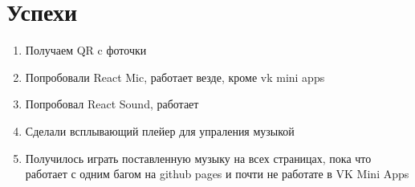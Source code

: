 \documentclass[11pt]{article}
\begin{document}
\section*{Успехи}

\begin{enumerate}
\item Получаем QR c фоточки
\item Попробовали React Mic, работает везде, кроме vk mini apps
\item Попробовал React Sound, работает
\item Сделали всплывающий плейер для упраления музыкой
\item Получилось играть поставленную музыку на всех страницах, пока что работает с одним багом на github pages и почти не работате в VK Mini Apps
\end{enumerate}
 
\end{document}
